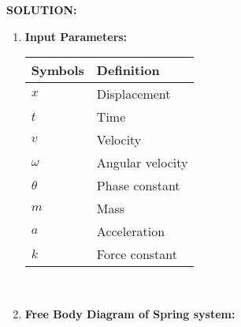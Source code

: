 \documentclass[journal,12pt,twocolumn]{IEEEtran}
\theoremstyle{remark}
\begin{document}
\textbf{SOLUTION:}\\
\begin{enumerate}
\item \textbf{Input Parameters:}
\begin{table}[h]
\begin{tabular}{|l|l|}
\hline
\textbf{Symbols} & \textbf{Definition}\\ \hline
$x$ & Displacement \\ \hline
$t$ & Time \\ \hline
$v$ & Velocity\\ \hline
$\omega$ & Angular velocity   \\ \hline
$\theta$ & Phase constant\\ \hline
$m$ & Mass\\ \hline
$a$ & Acceleration\\ \hline
$k$ & Force constant\\ \hline
\end{tabular}
\end{table}\\
\item \textbf{Free Body Diagram of Spring system:}
\end{enumerate}
\end{document}
